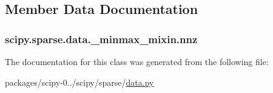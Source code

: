 \subsection{Member Data Documentation}
\hypertarget{classscipy_1_1sparse_1_1data_1_1__minmax__mixin_ae693893380c090babe6803e72f8432ac}{}
\subsubsection[{nnz}]{\setlength{\rightskip}{0pt plus 5cm}scipy.\+sparse.\+data.\+\_\+minmax\+\_\+mixin.\+nnz}\label{classscipy_1_1sparse_1_1data_1_1__minmax__mixin_ae693893380c090babe6803e72f8432ac}


The documentation for this class was generated from the following file\+:\begin{DoxyCompactItemize}
\item 
packages/scipy-\/0../scipy/sparse/\hyperlink{data_8py}{data.\+py}\end{DoxyCompactItemize}
